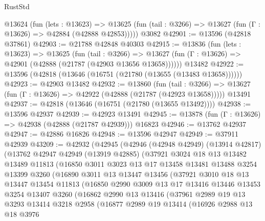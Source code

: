 \begin{lexlean}{RustStd}
\begin{coremodule}
    @13624
      (fun (lets : @13623) =>
      @13625 (fun (tail : @3266) => @13627 (fun (Γ : @13626) => @42884 (@42888 @42853)))))
    @3082
@42901 := @13596 (@42818 @37861)
@42903 := @21788 @42848 @40303
@42915 := @13836
    (fun (lets : @13623) =>
    @13625
      (fun (tail : @3266) =>
      @13627 (fun (Γ : @13626) => @42901 (@42888 (@21787 (@42903 @13656 @13658))))))
    @13482
@42922 := @13596 (@42818 (@13646 (@16751 (@21780 (@13655 (@13483 @13658))))))
@42923 := @42903 @13482
@42932 := @13860
    (fun (tail : @3266) => @13627 (fun (Γ : @13626) => @42922 (@42888 (@21787 (@42923 @13658)))))
    @13491
@42937 := @42818 (@13646 (@16751 (@21780 (@13655 @13492))))
@42938 := @13596 @42937
@42939 := @42923 @13491
@42945 := @13878 (fun (Γ : @13626) => @42938 (@42888 (@21787 @42939))) @16823
@42946 := @13762 @42937
@42947 := @42886 @16826
@42948 := @13596 @42947
@42949 := @37911 @42939
@43209 := @42932
    (@42945
      (@42946
        (@42948 @42949)
        (@13914 @42817)
        (@13762
          @42947
          @42949
          (@13919 @42885)
          (@37921
            @3024
            @18
            @13
            @13482
            @13489
            @11813
            (@16850
              @3011
              @3023
              @13
              @17
              @13458
              @13481
              @13488
              @3254
              @13399
              @3260
              (@16890
                @3011
                @13
                @13447
                @13456
                (@37921
                  @3010
                  @18
                  @13
                  @13447
                  @13454
                  @11813
                  (@16850
                    @2990
                    @3009
                    @13
                    @17
                    @13416
                    @13446
                    @13453
                    @3254
                    @13407
                    @3260
                    (@16862
                      @2990
                      @13
                      @13416
                      (@37961
                        @2989
                        @19
                        @13
                        @3293
                        @13414
                        @3218
                        @2958
                        (@16877
                          @2989
                          @19
                          @13414
                          (@16926
                            @2988
                            @13
                            @18
                            @3976

\end{coremodule}
\end{lexlean}
